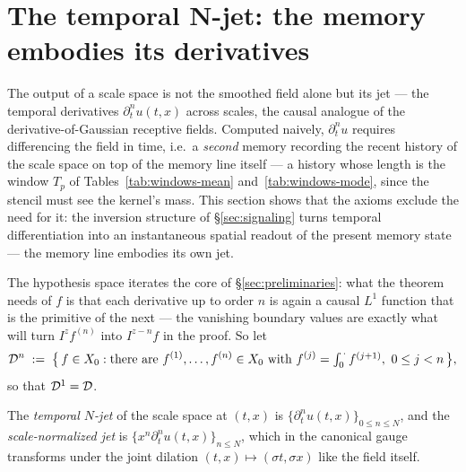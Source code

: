 
\section{The temporal N-jet: the memory embodies its derivatives}\label{sec:jet}

The output of a scale space is not the smoothed field alone but its jet --- the temporal
derivatives $\partial_t^n u(t, x)$ across scales, the causal analogue of the
derivative-of-Gaussian receptive fields. Computed naively, $\partial_t^n u$ requires
differencing the field in time, i.e.\ a \emph{second} memory recording the recent history of
the scale space on top of the memory line itself --- a history whose length is the window
$T_p$ of Tables~\ref{tab:windows-mean} and~\ref{tab:windows-mode}, since the stencil must
see the kernel's mass. This section shows that the axioms exclude
the need for it: the inversion structure of \S\ref{sec:signaling} turns temporal
differentiation into an instantaneous spatial readout of the present memory state --- the
memory line embodies its own jet.

The hypothesis space iterates the core of \S\ref{sec:preliminaries}: what the theorem needs
of $f$ is that each derivative up to order $n$ is again a causal $L^1$ function that is the
primitive of the next --- the vanishing boundary values are exactly what will turn
$I^{z}f^{(n)}$ into $I^{z-n}f$ in the proof. So let
\[
  \mathcal{D}^n \;:=\; \bigl\{\, f \in X_0 : \text{there are } f^{(1)}, \dots, f^{(n)} \in X_0
  \text{ with } f^{(j)} = \textstyle\int_0^{\,\cdot} f^{(j+1)},\ 0 \le j < n \,\bigr\},
\]
so that $\mathcal{D}^1 = \mathcal{D}$.

\begin{definition}\label{def:jet}
The \emph{temporal $N$-jet} of the scale space at $(t, x)$ is
$\{\partial_t^n u(t, x)\}_{0 \le n \le N}$, and the \emph{scale-normalized jet} is
$\{x^n \partial_t^n u(t, x)\}_{n \le N}$, which in the canonical gauge transforms under the
joint dilation $(t, x) \mapsto (\sigma t, \sigma x)$ like the field itself.
\end{definition}


